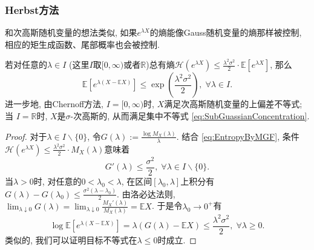 \subsubsection{Herbst方法}

和次高斯随机变量的想法类似, 如果$e^{\lambda X}$的熵能像Gauss随机变量的熵那样被控制, 相应的矩生成函数、尾部概率也会被控制.
\begin{theorem}[Herbst方法]\label{thm:HerbstArgument}
	若对任意的$\lambda \in I$ (这里$I$取$[0, \infty)$或者$\mathbb{R}$)总有熵$\mathcal{H}(e^{\lambda X}) \leq \frac{\lambda^2 \sigma^2}{2} \cdot \mathbb{E}[e^{\lambda X}]$, 那么
	\begin{equation*}
		\mathbb{E}\left[e^{\lambda(X - \mathbb{E}X)}\right] 
		\leq \exp \left( \frac{\lambda^2 \sigma^2}{2} \right),\; 
		\forall \lambda \in I. 
	\end{equation*}
	进一步地, 由Chernoff方法, $I = [0, \infty)$时, $X$满足次高斯随机变量的上偏差不等式; 当
	$I = \mathbb{R}$时, $X$是$\sigma$-次高斯的, 从而满足集中不等式 \eqref{eq:SubGuassianConcentration}.
\end{theorem}
\begin{proof}
	对于$\lambda \in I \backslash \{0\}$, 令$G(\lambda) := \frac{\log M_X(\lambda)}{\lambda}$. 
	结合 \eqref{eq:EntropyByMGF}, 条件$\mathcal{H}(e^{\lambda X}) \leq \frac{\lambda^2 \sigma^2}{2} \cdot M_X(\lambda)$意味着
	\begin{equation*}
		G'(\lambda) \leq \frac{\sigma^2}{2},\; \forall \lambda \in I \backslash \{0\}. 
	\end{equation*}
	当$\lambda > 0$时, 对任意的$0 < \lambda_0 < \lambda$, 在区间$[\lambda_0, \lambda]$上积分有$G(\lambda) - G(\lambda_0) \leq \frac{\sigma^2 (\lambda - \lambda_0)}{2}$. 
	由洛必达法则, $ \lim_{\lambda \downarrow 0} G(\lambda) = \lim_{\lambda \downarrow 0} \frac{M_X'(\lambda)}{M_X(\lambda)} = \mathbb{E}X$. 
	于是令$\lambda_0 \to 0^+$有
	\begin{equation*}
		\log \mathbb{E}\left[e^{\lambda(X - \mathbb{E}X)}\right]
		= \lambda(G(\lambda) - \mathbb{E}X)
		\leq \frac{\lambda^2 \sigma^2}{2} ,\; 
		\forall \lambda \geq 0. 
	\end{equation*}
	类似的, 我们可以证明目标不等式在$\lambda \leq 0$时成立. 
\end{proof}

